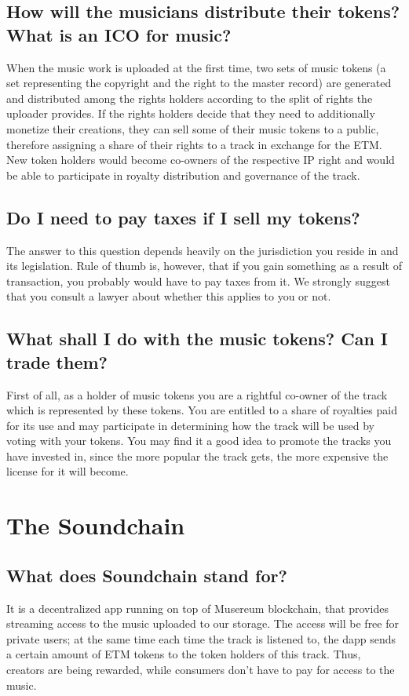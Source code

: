 \documentclass[12pt]{report}
\begin{document}
\section{How will the musicians distribute their tokens? What is an ICO for music?}
\label{ico-distribution}
When the music work is uploaded at the first time, two sets of music
tokens (a set representing the copyright and the right to the master
record) are generated and distributed among the rights holders
according to the split of rights the uploader provides. If the rights
holders decide that they need to additionally monetize their
creations, they can sell some of their music tokens to a public,
therefore assigning a share of their rights to a track in exchange for
the ETM. New token holders would become co-owners of the
respective IP right and would be able to participate in royalty
distribution and governance of the track.

\section{Do I need to pay taxes if I sell my tokens?}
\label{ico-taxes}
The answer to this question depends heavily on the jurisdiction you
reside in and its legislation. Rule of thumb is, however, that if you
gain something as a result of transaction, you probably would have to
pay taxes from it. We strongly suggest that you consult a lawyer about
whether this applies to you or not.

\section{What shall I do with the music tokens? Can I trade them?}
\label{ico-trade}
First of all, as a holder of music tokens you are a rightful co-owner of
the track which is represented by these tokens. You are entitled to a
share of royalties paid for its use and may participate in determining
how the track will be used by voting with your tokens. You may find it
a good idea to promote the tracks you have invested in, since the more
popular the track gets, the more expensive the license for it will
become.

\chapter{The Soundchain}
\label{soundchain}

\section{What does Soundchain stand for?}
\label{soundchain-stand}
It is a decentralized app running on top of Musereum blockchain, that
provides streaming access to the music uploaded to our storage. The
access will be free for private users; at the same time each time the
track is listened to, the dapp sends a certain amount of ETM tokens
to the token holders of this track. Thus, creators are being rewarded,
while consumers don't have to pay for access to the music.
\end{document}
